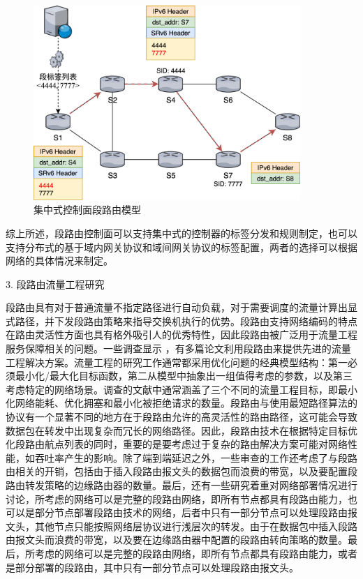 \begin{figure}[htbp]
\setlength{\abovecaptionskip}{15pt plus 3pt minus 2pt}
\centerline{\includegraphics[width=0.9\textwidth]{./figures/ch2-sr-model.png}}
\caption{集中式控制面段路由模型}
\label{fig-ch2-sr-model}
\end{figure}
    
综上所述，段路由控制面可以支持集中式的控制器的标签分发和规则制定，也可以支持分布式的基于域内网关协议和域间网关协议的标签配置，两者的选择可以根据网络的具体情况来制定。

3. 段路由流量工程研究

段路由具有对于普通流量不指定路径进行自动负载，对于需要调度的流量计算出显式路径，并下发段路由策略来指导交换机执行的优势。段路由支持网络编码的特点在路由灵活性方面也具有格外吸引人的优秀特性，因此段路由被广泛用于流量工程服务保障相关的问题。一些调查显示 \cite{SRSURVEYS} ，有多篇论文利用段路由来提供先进的流量工程解决方案。流量工程的研究工作通常都采用优化问题的经典模型结构：第一必须最小化/最大化目标函数，第二从模型中抽象出一组值得考虑的参数，以及第三考虑特定的网络场景。调查的文献中通常涵盖了三个不同的流量工程目标，即最小化网络能耗、优化拥塞和最小化被拒绝请求的数量。段路由与使用最短路径算法的协议有一个显著不同的地方在于段路由允许的高灵活性的路由路径，这可能会导致数据包在转发中出现复杂而冗长的网络路径。因此，段路由技术在根据特定目标优化段路由航点列表的同时，重要的是要考虑过于复杂的路由解决方案可能对网络性能，如吞吐率产生的影响。除了端到端延迟之外，一些审查的工作还考虑了与段路由相关的开销，包括由于插入段路由报文头的数据包而浪费的带宽，以及要配置段路由转发策略的边缘路由器的数量。最后，还有一些研究着重对网络部署情况进行讨论，所考虑的网络可以是完整的段路由网络，即所有节点都具有段路由能力，也可以是部分节点部署段路由技术的网络，后者中只有一部分节点可以处理段路由报文头，其他节点只能按照网络层协议进行浅层次的转发。由于在数据包中插入段路由报文头而浪费的带宽，以及要在边缘路由器中配置的段路由转向策略的数量。最后，所考虑的网络可以是完整的段路由网络，即所有节点都具有段路由能力，或者是部分部署的段路由，其中只有一部分节点可以处理段路由报文头。


